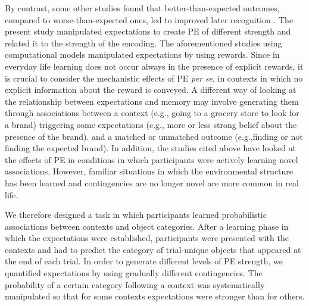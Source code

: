 \documentclass[a4paper,12pt]{article}
\begin{document}
By contrast, some other studies found that better-than-expected outcomes, compared to worse-than-expected ones, led to improved later recognition  \cite[][Experiment 2 ]{Jang2019, de2018signed, Rouhani2021}. The present study manipulated expectations to create PE of different strength and related it to the strength of the encoding. %
The aforementioned studies using computational models manipulated expectations by using rewards. Since in everyday life learning does not occur always in the presence of explicit rewards, it is crucial to consider the mechanistic effects of PE \textit{per se}, in contexts in which no explicit information about the reward is conveyed. A different way of looking at the relationship between expectations and memory may involve generating them through associations between a context (e.g., going to a grocery store to look for a brand) triggering some expectations (e.g., more or less strong belief about the presence of the brand). and a matched or unmatched outcome (e.g.,finding or not finding the expected brand). 
In addition, the studies cited above have looked at the effects of PE in conditions in which participants were actively learning novel associations. However, familiar situations in which the environmental structure has been learned and contingencies are no longer novel are more common in real life. \par
We therefore designed a task in which participants learned probabilistic associations between contexts and object categories. After a learning phase in which the expectations were established, participants were presented with the contexts and had to predict the category of trial-unique objects that appeared at the end of each trial. In order to generate different levels of PE strength, we quantified expectations by using gradually different contingencies. The probability of a certain category following a context was systematically manipulated so that for some contexts expectations were stronger than for others.
\end{document}
